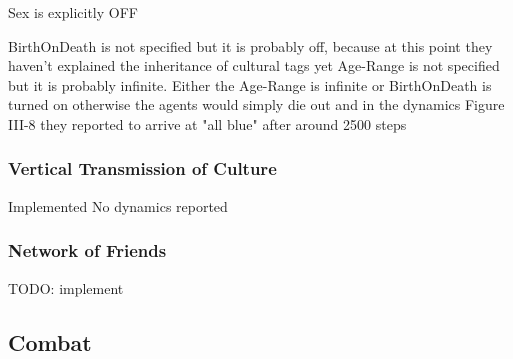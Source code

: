 Sex is explicitly OFF

BirthOnDeath is not specified but it is probably off, because at this point they haven't explained the inheritance of cultural tags yet
Age-Range is not specified but it is probably infinite. Either the Age-Range is infinite or BirthOnDeath is turned on otherwise the agents would simply die out and in the dynamics Figure III-8 they reported to arrive at "all blue" after around 2500 steps

\subsubsection{Vertical Transmission of Culture}
Implemented
No dynamics reported

\subsubsection{Network of Friends}
TODO: implement

\subsection{Combat}